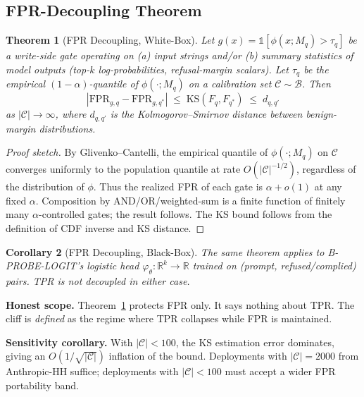 \documentclass[11pt,a4paper]{article}
\newtheorem{theorem}{Theorem}
\newtheorem{corollary}[theorem]{Corollary}
\begin{document}
\subsection{FPR-Decoupling Theorem}
\label{sec:decoupling}

\begin{theorem}[FPR Decoupling, White-Box]
\label{thm:decoupling}
Let $g(x) = \mathbb{1}[\phi(x; M_q) > \tau_q]$ be a write-side gate operating on
(a) input strings and/or (b) summary statistics of model outputs (top-$k$
log-probabilities, refusal-margin scalars).
Let $\tau_q$ be the empirical $(1-\alpha)$-quantile of $\phi(\cdot; M_q)$ on a
calibration set $\mathcal{C} \sim \mathcal{B}$.
Then
\[
|\mathrm{FPR}_{g, q} - \mathrm{FPR}_{g, q^*}| \;\le\; \mathrm{KS}(F_q, F_{q^*}) \;\le\; d_{q, q'}
\]
as $|\mathcal{C}| \to \infty$, where $d_{q, q'}$ is the Kolmogorov--Smirnov distance
between benign-margin distributions.
\end{theorem}

\begin{proof}[Proof sketch]
By Glivenko--Cantelli, the empirical quantile of $\phi(\cdot; M_q)$ on $\mathcal{C}$
converges uniformly to the population quantile at rate $O(|\mathcal{C}|^{-1/2})$,
regardless of the distribution of $\phi$.
Thus the realized FPR of each gate is $\alpha + o(1)$ at any fixed $\alpha$.
Composition by AND/OR/weighted-sum is a finite function of finitely many
$\alpha$-controlled gates; the result follows.
The KS bound follows from the definition of CDF inverse and KS distance.
\end{proof}

\begin{corollary}[FPR Decoupling, Black-Box]
\label{cor:blackbox}
The same theorem applies to B-PROBE-LOGIT's logistic head $\varphi_\theta : \mathbb{R}^k \to \mathbb{R}$
trained on (prompt, refused/complied) pairs.
TPR is \emph{not} decoupled in either case.
\end{corollary}

\noindent\textbf{Honest scope.}
Theorem~\ref{thm:decoupling} protects FPR only.
It says nothing about TPR.
The cliff is \emph{defined} as the regime where TPR collapses while FPR is maintained.

\noindent\textbf{Sensitivity corollary.}
With $|\mathcal{C}| < 100$, the KS estimation error dominates, giving an $O(1/\sqrt{|\mathcal{C}|})$
inflation of the bound.
Deployments with $|\mathcal{C}| = 2000$ from Anthropic-HH suffice; deployments with
$|\mathcal{C}| < 100$ must accept a wider FPR portability band.
\end{document}
